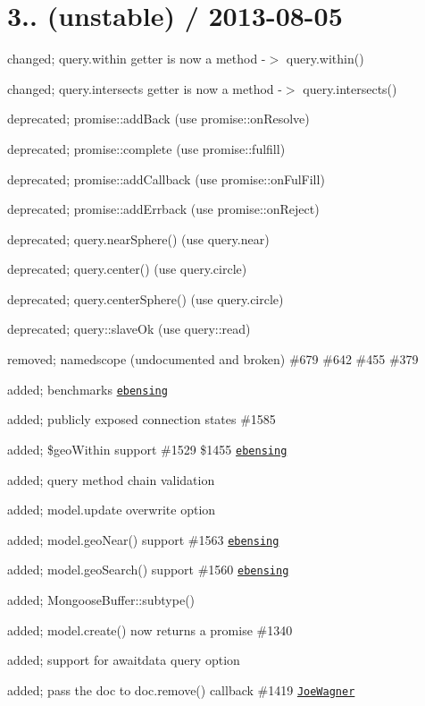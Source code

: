 \section*{3.. (unstable) / 2013-\/08-\/05 }


\begin{DoxyItemize}
\item changed; query.\+within getter is now a method -\/$>$ query.\+within()
\item changed; query.\+intersects getter is now a method -\/$>$ query.\+intersects()
\item deprecated; promise\+::add\+Back (use promise\+::on\+Resolve)
\item deprecated; promise\+::complete (use promise\+::fulfill)
\item deprecated; promise\+::add\+Callback (use promise\+::on\+Ful\+Fill)
\item deprecated; promise\+::add\+Errback (use promise\+::on\+Reject)
\item deprecated; query.\+near\+Sphere() (use query.\+near)
\item deprecated; query.\+center() (use query.\+circle)
\item deprecated; query.\+center\+Sphere() (use query.\+circle)
\item deprecated; query\+::slave\+Ok (use query\+::read)
\item removed; namedscope (undocumented and broken) \#679 \#642 \#455 \#379
\item added; benchmarks \href{https://github.com/ebensing}{\tt ebensing}
\item added; publicly exposed connection states \#1585
\item added; \$geo\+Within support \#1529 \$1455 \href{https://github.com/ebensing}{\tt ebensing}
\item added; query method chain validation
\item added; model.\+update {\ttfamily overwrite} option
\item added; model.\+geo\+Near() support \#1563 \href{https://github.com/ebensing}{\tt ebensing}
\item added; model.\+geo\+Search() support \#1560 \href{https://github.com/ebensing}{\tt ebensing}
\item added; Mongoose\+Buffer\+::subtype()
\item added; model.\+create() now returns a promise \#1340
\item added; support for {\ttfamily awaitdata} query option
\item added; pass the doc to doc.\+remove() callback \#1419 \href{https://github.com/JoeWagner}{\tt Joe\+Wagner}

\end{DoxyItemize}
